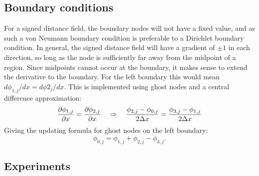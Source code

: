 \documentclass[sigconf]{acmart}
\begin{document}
\subsection{Boundary conditions}
For a signed distance field, the boundary nodes will not have a fixed value, and as such a von Neumann boundary condition is preferable to a Dirichlet boundary condition. In general, the signed distance field will have a gradient of $ \pm 1 $ in each direction, so long as the node is sufficiently far away from the midpoint of a region. Since midpoints cannot occur at the boundary, it makes sense to extend the derivative to the boundary. For the left boundary this would mean $ d\phi_{1,j}/dx = d\phi{2_j}/dx$. This is implemented using ghost nodes and a central difference approximation:
\begin{equation}\label{key}
	\frac{\partial \phi_{1,j}}{\partial x} = \frac{\partial \phi_{2,j}}{\partial x} \quad \Rightarrow \quad \frac{\phi_{2,j} - \phi_{0,j}}{2\Delta x} = \frac{\phi_{3,j} - \phi_{1,j}}{2 \Delta x}
\end{equation}
Giving the updating formula for ghost nodes on the left boundary:
\begin{equation}\label{key}
	\phi_{0,j} = \phi_{1,j} + \phi_{2,j} - \phi_{3,j}.
\end{equation}

\subsection{Experiments}
\end{document}
